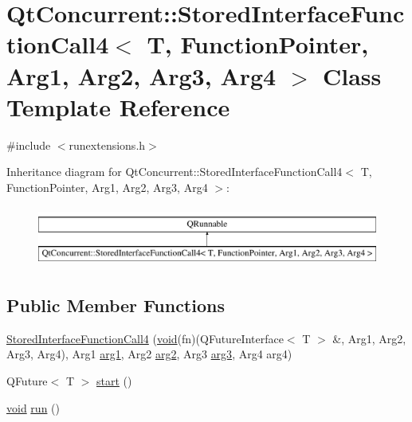 \hypertarget{class_qt_concurrent_1_1_stored_interface_function_call4}{\section{Qt\-Concurrent\-:\-:Stored\-Interface\-Function\-Call4$<$ T, Function\-Pointer, Arg1, Arg2, Arg3, Arg4 $>$ Class Template Reference}
\label{class_qt_concurrent_1_1_stored_interface_function_call4}
}


{\ttfamily \#include $<$runextensions.\-h$>$}

Inheritance diagram for Qt\-Concurrent\-:\-:Stored\-Interface\-Function\-Call4$<$ T, Function\-Pointer, Arg1, Arg2, Arg3, Arg4 $>$\-:\begin{figure}[H]
\begin{center}
\leavevmode
\includegraphics[height=2.000000cm]{class_qt_concurrent_1_1_stored_interface_function_call4}
\end{center}
\end{figure}
\subsection*{Public Member Functions}
\begin{DoxyCompactItemize}
\item 
\hyperlink{class_qt_concurrent_1_1_stored_interface_function_call4_ac3df3397ec523fed6a1e2ffdbc6d8c73}{Stored\-Interface\-Function\-Call4} (\hyperlink{group___u_a_v_objects_plugin_ga444cf2ff3f0ecbe028adce838d373f5c}{void}(fn)(Q\-Future\-Interface$<$ T $>$ \&, Arg1, Arg2, Arg3, Arg4), Arg1 \hyperlink{glext_8h_a4b247ab422408c1761a36f9034c2585b}{arg1}, Arg2 \hyperlink{glext_8h_a5aee5a44bf92a9837fea48e41ef0df57}{arg2}, Arg3 \hyperlink{glext_8h_a525a52cc20e1aa70741e5c7dae172f25}{arg3}, Arg4 arg4)
\item 
Q\-Future$<$ T $>$ \hyperlink{class_qt_concurrent_1_1_stored_interface_function_call4_a79b19894bb0a5c7464a1cf1df83dcede}{start} ()
\item 
\hyperlink{group___u_a_v_objects_plugin_ga444cf2ff3f0ecbe028adce838d373f5c}{void} \hyperlink{class_qt_concurrent_1_1_stored_interface_function_call4_a4109c8906c4ef0111e5c992eb796ebc8}{run} ()
\end{DoxyCompactItemize}


